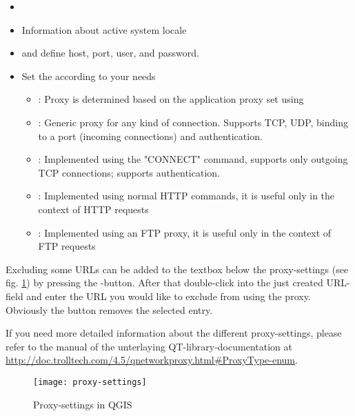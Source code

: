
\begin{itemize}
\item {}
\item Information about active system locale
\end{itemize}


\begin{itemize}
\item {} and define host, port, user, and password.
\item Set the  according to your needs
 \begin{itemize}
  \item {}: Proxy is determined based on the application proxy set using
  \item {}: Generic proxy for any kind of connection. Supports TCP, UDP, binding to a port (incoming connections) and authentication.
  \item {}: Implemented using the "CONNECT" command, supports only outgoing TCP connections; supports authentication.
  \item {}: Implemented using normal HTTP commands, it is useful only in the context of HTTP requests
  \item {}: Implemented using an FTP proxy, it is useful only in the context of FTP requests
 \end{itemize}
\end{itemize}

Excluding some URLs can be added to the textbox below the proxy-settings (see
fig. \ref{fig:proxy-settings}) by pressing the -button. After that
double-click into the just created URL-field and enter the URL you would like
to exclude from using the proxy. Obviously the button  removes the selected
entry.

If you need more detailed information about the different proxy-settings,
please refer to the manual of the unterlaying QT-library-documentation at
\url{http://doc.trolltech.com/4.5/qnetworkproxy.html#ProxyType-enum}.

\begin{figure}[ht]
   \begin{center}
   \caption{Proxy-settings in QGIS \nixcaption}
   \texttt{[image: proxy-settings]}
   \label{fig:proxy-settings}
\end{center} 
\end{figure}

